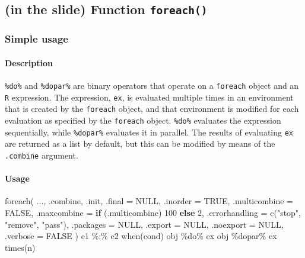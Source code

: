 \documentclass[
]{article}
\newenvironment{Shaded}{}{}
\newcommand{\AttributeTok}[1]{\textcolor[rgb]{0.49,0.56,0.16}{#1}}
\newcommand{\ConstantTok}[1]{\textcolor[rgb]{0.53,0.00,0.00}{#1}}
\newcommand{\ControlFlowTok}[1]{\textcolor[rgb]{0.00,0.44,0.13}{\textbf{#1}}}
\newcommand{\DecValTok}[1]{\textcolor[rgb]{0.25,0.63,0.44}{#1}}
\newcommand{\FunctionTok}[1]{\textcolor[rgb]{0.02,0.16,0.49}{#1}}
\newcommand{\NormalTok}[1]{#1}
\newcommand{\SpecialCharTok}[1]{\textcolor[rgb]{0.25,0.44,0.63}{#1}}
\newcommand{\StringTok}[1]{\textcolor[rgb]{0.25,0.44,0.63}{#1}}
\begin{document}
\hypertarget{in-the-slide-function-foreach}{%
\subsection{\texorpdfstring{(in the slide) Function
\texttt{foreach()}}{(in the slide) Function foreach()}}\label{in-the-slide-function-foreach}}

\hypertarget{simple-usage}{%
\subsubsection{Simple usage}\label{simple-usage}}

\hypertarget{description-3}{%
\paragraph{Description}\label{description-3}}

\texttt{⁠\%do\%⁠} and \texttt{⁠\%dopar\%⁠} are binary operators that operate
on a \texttt{foreach} object and an \texttt{R} expression. The
expression, \texttt{ex}, is evaluated multiple times in an environment
that is created by the \texttt{foreach} object, and that environment is
modified for each evaluation as specified by the \texttt{foreach}
object. \texttt{⁠\%do\%⁠} evaluates the expression sequentially, while
\texttt{⁠\%dopar\%⁠} evaluates it in parallel. The results of evaluating
\texttt{ex} are returned as a list by default, but this can be modified
by means of the \texttt{.combine} argument.

\hypertarget{usage-2}{%
\paragraph{Usage}\label{usage-2}}

\begin{Shaded}
\begin{Highlighting}[]
\FunctionTok{foreach}\NormalTok{(}
\NormalTok{  ...,}
\NormalTok{  .combine,}
\NormalTok{  .init,}
  \AttributeTok{.final =} \ConstantTok{NULL}\NormalTok{,}
  \AttributeTok{.inorder =} \ConstantTok{TRUE}\NormalTok{,}
  \AttributeTok{.multicombine =} \ConstantTok{FALSE}\NormalTok{,}
  \AttributeTok{.maxcombine =} \ControlFlowTok{if}\NormalTok{ (.multicombine) }\DecValTok{100} \ControlFlowTok{else} \DecValTok{2}\NormalTok{,}
  \AttributeTok{.errorhandling =} \FunctionTok{c}\NormalTok{(}\StringTok{"stop"}\NormalTok{, }\StringTok{"remove"}\NormalTok{, }\StringTok{"pass"}\NormalTok{),}
  \AttributeTok{.packages =} \ConstantTok{NULL}\NormalTok{,}
  \AttributeTok{.export =} \ConstantTok{NULL}\NormalTok{,}
  \AttributeTok{.noexport =} \ConstantTok{NULL}\NormalTok{,}
  \AttributeTok{.verbose =} \ConstantTok{FALSE}
\NormalTok{)}
\NormalTok{e1 }\SpecialCharTok{\%:\%}\NormalTok{ e2}
\FunctionTok{when}\NormalTok{(cond)}
\NormalTok{obj }\SpecialCharTok{\%do\%}\NormalTok{ ex}
\NormalTok{obj }\SpecialCharTok{\%dopar\%}\NormalTok{ ex}
\FunctionTok{times}\NormalTok{(n)}
\end{Highlighting}
\end{Shaded}
\end{document}
